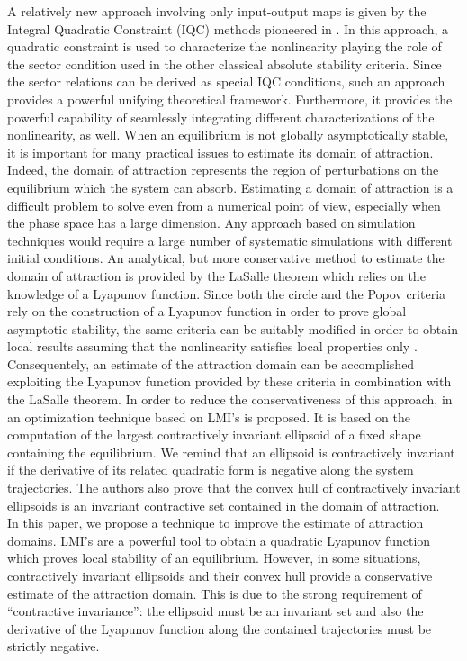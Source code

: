 \documentclass[letterpaper,10pt,twocolumn,journal,final]{IEEEtran}
\begin{document}
A relatively new approach involving only input-output maps is given by the Integral Quadratic Constraint (IQC) methods pioneered in \cite{MegRan97}. In this approach, a quadratic constraint is used to characterize the nonlinearity playing the role of the sector condition used in the other classical absolute stability criteria.
Since the sector relations can be derived as special IQC conditions, such an approach provides  a powerful unifying theoretical framework. Furthermore, it provides the powerful capability of seamlessly integrating different characterizations of the nonlinearity, as well.
When an equilibrium is not globally asymptotically stable, it is important for many practical issues to estimate its domain of attraction. Indeed, the domain of attraction represents the region of perturbations on the equilibrium which the system can absorb. Estimating a domain of attraction is a difficult problem to solve even from a numerical point of view, especially when the phase space has a large dimension.
Any approach based on simulation techniques would require a large number of systematic simulations with different initial conditions. An analytical, but more conservative method to estimate the domain of attraction is provided by the LaSalle theorem \cite{Khalil,Vidyasagar} which relies on the knowledge of a Lyapunov function.
Since both the circle and the Popov criteria rely on the construction of a Lyapunov function in order to prove global asymptotic stability, the same criteria can be suitably modified in order to obtain local results assuming that the nonlinearity satisfies local properties only \cite{Khalil}. Consequentely, an estimate of the attraction domain can be accomplished exploiting the Lyapunov function provided by these criteria in combination with the LaSalle theorem.
In order to reduce the conservativeness of this approach, in \cite{HuxHua04} an optimization technique based on LMI's is proposed. It is based on the computation of the largest contractively invariant ellipsoid of a fixed shape containing the equilibrium. We remind that an ellipsoid is contractively invariant if the derivative of its related quadratic form is negative along the system trajectories. The authors also prove that the convex hull of contractively invariant ellipsoids is an invariant contractive set contained in the domain of attraction.\\
In this paper, we propose a technique to improve the estimate of attraction domains. LMI's are a powerful tool to obtain a quadratic Lyapunov function which proves local stability of an equilibrium. However, in some situations, contractively invariant ellipsoids and their convex hull provide a conservative estimate of the attraction domain. This is due to the strong requirement of ``contractive invariance'': the ellipsoid must be an invariant set and also the derivative of the Lyapunov function along the contained trajectories must be strictly negative.
\end{document}
